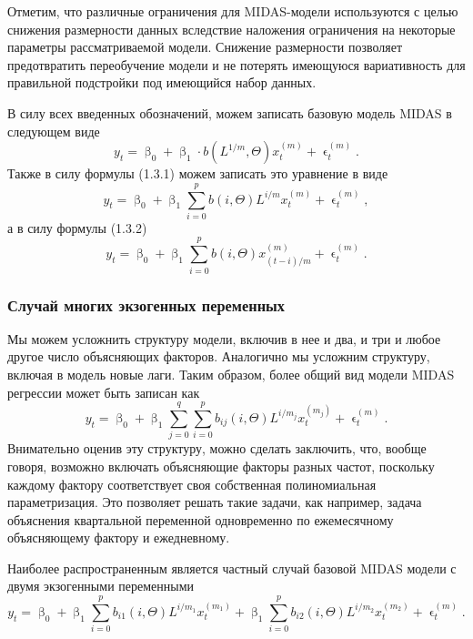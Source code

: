 \documentclass[a4paper, 12pt]{extarticle}
\numberwithin{equation}{subsection}
\renewcommand{\beta}{\upbeta}
\renewcommand{\epsilon}{\upvarepsilon}
\begin{document}
	Отметим, что различные ограничения для MIDAS-модели используются с целью снижения размерности данных вследствие наложения ограничения на некоторые параметры рассматриваемой модели. Снижение размерности позволяет предотвратить переобучение модели и не потерять имеющуюся вариативность для правильной подстройки под имеющийся набор данных. 
	
	В силу всех введенных обозначений, можем записать базовую модель MIDAS в следующем виде
	\begin{equation}
		y_t = \beta_0 + \beta_1\cdot b(L^{1/m}, \Theta) x_t^{(m)} + \epsilon_t^{(m)}.
	\end{equation}
	Также  в силу формулы (1.3.1) можем записать это уравнение в виде \begin{equation}
		y_t = \beta_0 + \beta_1 \sum_{i=0}^{p} b(i,\Theta) L^{i/m} x_t^{(m)} + \epsilon_t^{(m)},
	\end{equation}
	а в силу формулы (1.3.2)
	\begin{equation}
		y_t = \beta_0 + \beta_1 \sum_{i=0}^{p} b(i,\Theta) x_{(t-i)/m}^{(m)} + \epsilon_t^{(m)}.
	\end{equation}
	\subsubsection{Случай многих экзогенных переменных}
	Мы можем усложнить структуру модели, включив в нее и два, и три и любое другое число объясняющих факторов. Аналогично мы усложним структуру, включая в модель новые лаги. Таким образом, более общий вид модели MIDAS регрессии может быть записан как 
	\begin{equation}
		y_t = \beta_0 + \beta_1\sum_{j=0}^{q} \sum_{i=0}^{p} b_{ij}(i,\Theta) L^{i/m_j} x_t^{(m_j)} + \epsilon_t^{(m)}.
	\end{equation}
	Внимательно оценив эту структуру, можно сделать заключить, что, вообще говоря, возможно включать объясняющие факторы разных частот, поскольку каждому фактору соответствует своя собственная полиномиальная параметризация. Это позволяет решать такие задачи, как например, задача объяснения квартальной переменной одновременно по ежемесячному объясняющему фактору и ежедневному.
	
	Наиболее распространенным является частный случай базовой MIDAS модели с двумя экзогенными переменными
	\begin{equation}
		y_t = \beta_0 + \beta_1\sum_{i=0}^{p} b_{i1}(i,\Theta) L^{i/m_1} x_t^{(m_1)} + \beta_1\sum_{i=0}^{p} b_{i2}(i,\Theta) L^{i/m_2} x_t^{(m_2)} + \epsilon_t^{(m)}.
	\end{equation}
\end{document}
